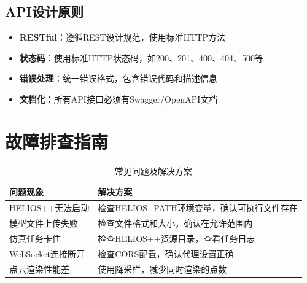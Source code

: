\documentclass[a4paper,fleqn]{cas-sc}
\begin{document}
\subsection{API设计原则}
\begin{itemize}
    \item \textbf{RESTful}：遵循REST设计规范，使用标准HTTP方法
    \item \textbf{状态码}：使用标准HTTP状态码，如200、201、400、404、500等
    \item \textbf{错误处理}：统一错误格式，包含错误代码和描述信息
    \item \textbf{文档化}：所有API接口必须有Swagger/OpenAPI文档
\end{itemize}

\section{故障排查指南}

\begin{table}[pos=!htbp]
    \centering
    \caption{常见问题及解决方案}
    \label{tab:troubleshooting}
    \begin{tabular}{@{} ll @{}}
        \toprule
        \textbf{问题现象} & \textbf{解决方案}                \\
        \midrule
        HELIOS++无法启动  & 检查HELIOS\_PATH环境变量，确认可执行文件存在 \\
        模型文件上传失败      & 检查文件格式和大小，确认在允许范围内           \\
        仿真任务卡住        & 检查HELIOS++资源目录，查看任务日志        \\
        WebSocket连接断开 & 检查CORS配置，确认代理设置正确            \\
        点云渲染性能差       & 使用降采样，减少同时渲染的点数              \\
        \bottomrule
    \end{tabular}
\end{table}
\end{document}
